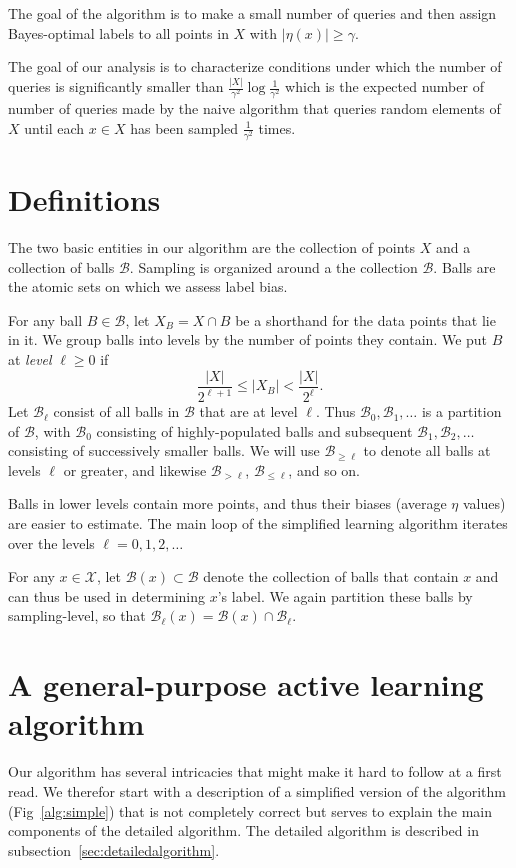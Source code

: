 \documentclass[twoside]{article}
\def\X{{\mathcal X}}
\def\B{{\mathcal B}}
\begin{document}
The goal of the algorithm is to make a small number of queries and then
assign Bayes-optimal labels to all points in $X$ with $|\eta(x)| \geq \gamma$.

The goal of our analysis is to characterize conditions under which the
number of queries is significantly smaller than
$\frac{|X|}{\gamma^2}\log \frac{1}{\gamma^2}$ which is the expected
  number of number of queries made by the naive algorithm that queries
  random elements of $X$ until each $x \in X$ has been sampled
  $\frac{1}{\gamma^2}$ times.

\section{Definitions}

The two basic entities in our algorithm are the collection of points
$X$ and a collection of balls $\B$. Sampling is organized around a the
collection $\B$. Balls are the atomic sets on which we assess label
bias.

For any ball $B \in \B$, let $X_B = X \cap B$ be a shorthand for the
data points that lie in it.  We group balls into levels by the number
of points they contain. We put $B$ at {\it level} $\ell \geq 0$ if
\begin{equation}
\frac{|X|}{2^{\ell + 1}} \leq |X_B| < \frac{|X|}{2^\ell} .
\label{eq:sampling-level}
\end{equation}
Let $\B_\ell$ consist of all balls in $\B$ that are at level
$\ell$. Thus $\B_0, \B_1, \ldots$ is a partition of $\B$, with $\B_0$
consisting of highly-populated balls and subsequent
$\B_1, \B_2, \ldots$ consisting of successively smaller balls. We will
use $\B_{\geq \ell}$ to denote all balls at levels $\ell$ or greater,
and likewise $\B_{> \ell}$, $\B_{\leq \ell}$, and so on.

Balls in lower levels contain more points, and thus their biases
(average $\eta$ values) are easier to estimate. The main loop of the
simplified learning algorithm iterates over the levels $\ell=0,1,2,\ldots$

For any $x \in \X$, let $\B(x) \subset \B$ denote the collection of
balls that contain $x$ and can thus be used in determining $x$'s
label. We again partition these balls by sampling-level, so that
$\B_\ell(x) = \B(x) \cap \B_\ell$.

\section{A general-purpose active learning algorithm}
\label{sec:algorithm}
Our algorithm has several intricacies that might make it hard to
follow at a first read.  We therefor start with a description of a
simplified version of the algorithm (Fig~\ref{alg:simple}) that is not
completely correct but serves to explain the main components of the
detailed algorithm. The detailed algorithm is described in
subsection~\ref{sec:detailedalgorithm}.
\end{document}
